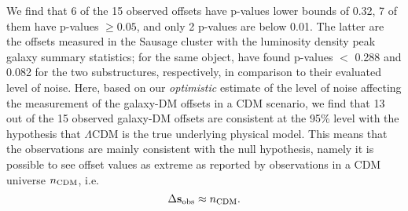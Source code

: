 \documentclass[usenatbib]{mn2e}
\newcommand{\ap}[1]{\textcolor{cyan}{#1}}
\newcommand{\offset}{\Delta {\bf s}}
\begin{document}
{We find that 6 of the 15 observed offsets have p-values lower bounds of 0.32, 7 of them have p-values $ \ge 0.05$, and only 2 p-values are below 0.01. The latter are the offsets measured in the Sausage cluster with the luminosity density peak galaxy summary statistics; for the same object, \cite{Jee2015} have found p-values $<$ 0.288 and 0.082 for the two substructures, respectively, in comparison to their evaluated level of noise. 
Here, based on our {\it optimistic} estimate of the level of noise affecting the measurement of the galaxy-DM offsets in a CDM scenario, we find that 13 out of the 15 observed galaxy-DM offsets are consistent at the 95\% level with the hypothesis that $\Lambda$CDM is the true underlying physical model.
This means that the observations are mainly consistent with the null hypothesis, namely it is possible to see offset values as extreme as reported by observations in a CDM universe $n_{\rm CDM}$, i.e. 
\begin{equation}
\offset_{\rm obs} \approx n_{\rm CDM}. 
\end{equation}



}
\end{document}
